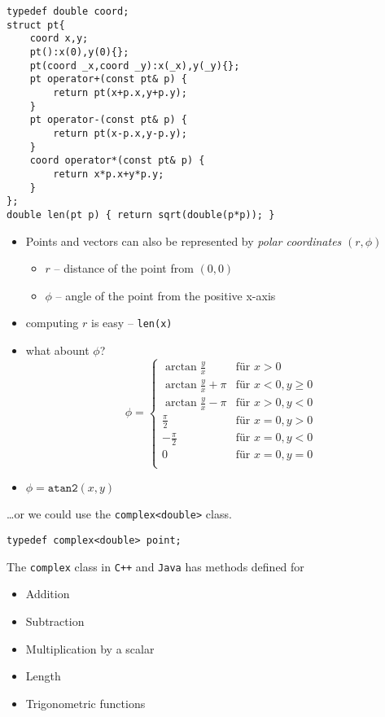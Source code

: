 \documentclass[12pt,t]{beamer}
\newcommand{\bi}{\begin{itemize}}
\newcommand{\ei}{\end{itemize}}
\begin{document}
\begin{frame}[fragile]
  \begin{verbatim}
typedef double coord;
struct pt{
    coord x,y;
    pt():x(0),y(0){};
    pt(coord _x,coord _y):x(_x),y(_y){};
    pt operator+(const pt& p) {
        return pt(x+p.x,y+p.y);
    }
    pt operator-(const pt& p) {
        return pt(x-p.x,y-p.y);
    }
    coord operator*(const pt& p) {
        return x*p.x+y*p.y;
    }
};
double len(pt p) { return sqrt(double(p*p)); }
  \end{verbatim}
\end{frame}

\begin{frame}[fragile]
  \bi
  	\item Points and vectors can also be represented by \emph{polar coordinates}
  	$(r,\phi)$
  	\bi
  		\item $r$ -- distance of the point from $(0,0)$
  		\item $\phi$ -- angle of the point from the positive x-axis
  	\ei
  	\item computing $r$ is easy -- \texttt{len(x)}
  	\item what abount $\phi$? \pause
  	\[\phi = \begin{cases}
  			\arctan \frac{y}{x} &\text{für } x > 0 \\
  			\arctan \frac{y}{x} + \pi &\text{für } x < 0, y \geq 0 \\
  			\arctan \frac{y}{x} -\pi &\text{für } x > 0, y < 0\\
  			\frac{\pi}{2} &\text{für } x = 0, y > 0 \\
  			-\frac{\pi}{2} &\text{für } x = 0, y < 0 \\
  			0 &\text{für } x = 0, y = 0 \\
  		\end{cases}\]
  		\pause
  	\item $\phi = \texttt{atan2}(x,y)$
  \ei
\end{frame}

\begin{frame}[fragile]
  \vspace{20pt}
  \ldots or we could use the \texttt{complex<double>} class.
  \begin{verbatim}
typedef complex<double> point;
  \end{verbatim}
  \vspace{10pt}
  The \texttt{complex} class in \texttt{C++} and \texttt{Java} has methods defined for
  \bi
    \item Addition
    \item Subtraction
    \item Multiplication by a scalar
    \item Length
    \item Trigonometric functions
  \ei
\end{frame}
\end{document}
